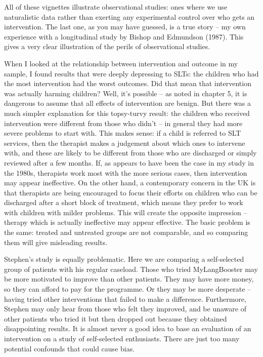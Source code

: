 \documentclass[]{book}
\begin{document}
All of these vignettes illustrate observational studies: ones where we use naturalistic data rather than exerting any experimental control over who gets an intervention. The last one, as you may have guessed, is a true story -- my own experience with a longitudinal study by Bishop and Edmundson (1987). This gives a very clear illustration of the perils of observational studies.

When I looked at the relationship between intervention and outcome in my sample, I found results that were deeply depressing to SLTs: the children who had the most intervention had the worst outcomes. Did that mean that intervention was actually harming children? Well, it's possible -- as noted in chapter 5, it is dangerous to assume that all effects of intervention are benign. But there was a much simpler explanation for this topsy-turvy result: the children who received intervention were different from those who didn't -- in general they had more severe problems to start with. This makes sense: if a child is referred to SLT services, then the therapist makes a judgement about which ones to intervene with, and these are likely to be different from those who are discharged or simply reviewed after a few months. If, as appears to have been the case in my study in the 1980s, therapists work most with the more serious cases, then intervention may appear ineffective. On the other hand, a contemporary concern in the UK is that therapists are being encouraged to focus their efforts on children who can be discharged after a short block of treatment, which means they prefer to work with children with milder problems. This will create the opposite impression -- therapy which is actually ineffective may appear effective. The basic problem is the same: treated and untreated groups are not comparable, and so comparing them will give misleading results.

Stephen's study is equally problematic. Here we are comparing a self-selected group of patients with his regular caseload. Those who tried MyLangBooster may be more motivated to improve than other patients. They may have more money, so they can afford to pay for the programme. Or they may be more desperate -- having tried other interventions that failed to make a difference. Furthermore, Stephen may only hear from those who felt they improved, and be unaware of other patients who tried it but then dropped out because they obtained disappointing results. It is almost never a good idea to base an evaluation of an intervention on a study of self-selected enthusiasts. There are just too many potential confounds that could cause bias.
\end{document}
